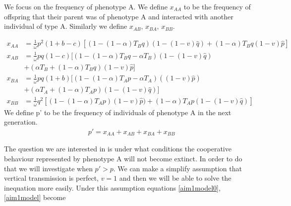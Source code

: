 \documentclass{article}
\begin{document}
We focus on the frequency of phenotype A. We define $x_{AA}$ to be the frequency of offspring that their parent was of phenotype A and interacted with another individual of type A. Similarly we define $x_{AB}, \, x_{BA}, \, x_{BB}$.

\begin{equation} 
\begin{split}\label{aim1model0}
 x_{AA} &= \frac{1}{\overline{\omega}}p^2(1+b-c)[(1-(1-\alpha)T_Bq)(1-(1-v)\hat{q})+(1-\alpha)T_Bq(1-v)\hat{p}]\\
 x_{AB} &= \frac{1}{\overline{\omega}}pq(1-c)[(1-(1-\alpha)T_Bq-\alpha T_B)(1-(1-v)\hat{q}) \\ &+ (\alpha T_B+(1-\alpha)T_Bq)(1-v)\hat{p}]\\
 x_{BA} &= \frac{1}{\overline{\omega}}pq(1+b)[(1-(1-\alpha)T_Ap-\alpha T_A)((1-v)\hat{p})\\ & +(\alpha T_A+(1-\alpha)T_A p)(1-(1-v)\hat{q})] \\
 x_{BB} &= \frac{1}{\overline{\omega}}q^2[(1-(1-\alpha)T_Ap)(1-v)\hat{p})+(1-\alpha)T_Ap(1-(1-v)\hat{q})]
\end{split}
\end{equation}
We define p' to be the frequency of individuals of phenotype A in the next generation.
\begin{equation} 
\begin{split}\label{aim1model}
& p' = x_{AA} + x_{AB} + x_{BA} + x_{BB}
\end{split}
\end{equation}

The question we are interested in is under what conditions the cooperative behaviour represented by phenotype A will not become extinct. In order to do that we will investigate when $p' > p$.
We can make a simplify assumption that vertical transmission is perfect, $v=1$ and then we will be able to solve the inequation more easily. Under this assumption equations \eqref{aim1model0},\eqref{aim1model} become
\end{document}
